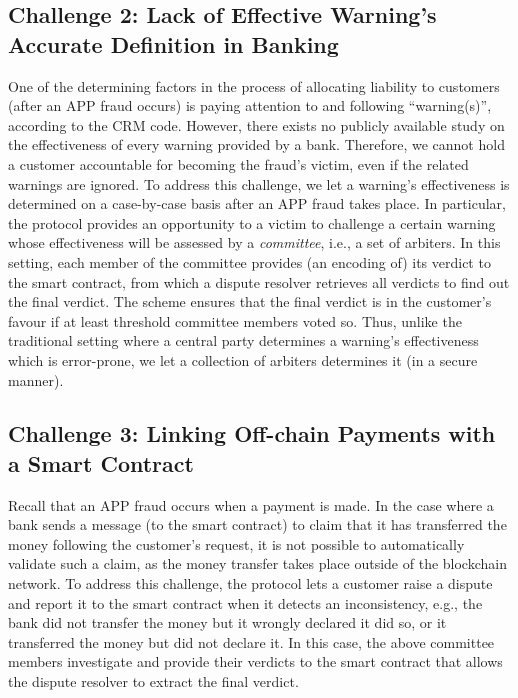 \subsection{Challenge 2: Lack of Effective Warning's Accurate Definition in Banking}

One of the determining  factors in the process of allocating liability to  customers (after an APP fraud occurs) is paying attention to and following ``warning(s)'', according to the CRM code. However, there exists  no  publicly available study  on the  effectiveness of every warning  provided by  a bank. Therefore, we cannot hold a customer accountable for becoming the fraud's victim,  even if the related warnings are ignored.    To address this challenge, we let a warning's effectiveness is determined on a case-by-case basis after an APP fraud takes place. In particular, the protocol provides an opportunity to a victim to  challenge a certain warning whose effectiveness will be assessed by a \emph{committee}, i.e., a  set of arbiters. In this setting, each member of the  committee provides (an encoding of) its verdict to the smart contract, from which a dispute resolver retrieves all verdicts to find out the final verdict. The scheme ensures that the final verdict is  in the customer's favour if at least threshold  committee members voted so. Thus, unlike the traditional setting where a central party determines a warning's effectiveness which is error-prone, we let a collection of arbiters   determines it (in a secure manner).




\subsection{Challenge 3: Linking Off-chain Payments with a Smart Contract}\label{sec::Linking Off-chain-Payments-with-contract}
 Recall that an APP fraud occurs when a payment is made. In the case where a  bank  sends a message (to the smart contract) to  claim  that it has transferred the money following the customer's request, it is not possible to automatically validate such a claim, as the money  transfer takes place  outside of the blockchain network. To address this challenge, the protocol lets a customer raise a dispute and report it to the smart contract when it detects an inconsistency, e.g., the bank did not transfer the money but it wrongly declared it did so, or  it transferred the money but did not declare it. In this case, the above committee members investigate and provide their  verdicts to the smart contract that allows the dispute resolver to extract the final verdict. 



